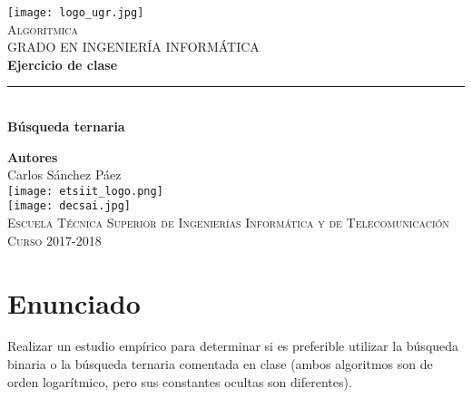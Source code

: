 \documentclass[12pt,spanish]{article}
\begin{document}
\begin{titlepage}

\newlength{\centeroffset}
\setlength{\centeroffset}{-0.5\oddsidemargin}
\addtolength{\centeroffset}{0.5\evensidemargin}
\thispagestyle{empty}

\noindent\hspace*{\centeroffset}
\begin{minipage}{\textwidth}

\centering
\texttt{[image: logo\_ugr.jpg]}\\[1.4cm]

\textsc{ \Large Algorítmica\\[0.2cm]}
\textsc{GRADO EN INGENIERÍA INFORMÁTICA}\\[1cm]

{\Huge\bfseries Ejercicio de clase\\}
\noindent\rule[-1ex]{\textwidth}{3pt}\\[3.5ex]
{\large\bfseries Búsqueda ternaria}
\end{minipage}

\vspace{1.5cm}
\noindent\hspace*{\centeroffset}
\begin{minipage}{\textwidth}
\centering

\textbf{Autores}\\ {Carlos Sánchez Páez}\\[2.5ex]
\texttt{[image: etsiit\_logo.png]}\\[0.1cm]
\vspace{1.5cm}
\texttt{[image: decsai.jpg]}\\[0.1cm]
\vspace{1cm}
\textsc{Escuela Técnica Superior de Ingenierías Informática y de Telecomunicación}\\
\vspace{1cm}
\textsc{Curso 2017-2018}
\end{minipage}
\end{titlepage}
\tableofcontents
\thispagestyle{empty}
\listoftables
\newpage
\setcounter{page}{1}

\section{Enunciado}
\large{Realizar un estudio empírico para determinar si es preferible utilizar la búsqueda binaria o la búsqueda ternaria comentada en clase (ambos algoritmos son de orden logarítmico, pero sus constantes ocultas son diferentes).}
\end{document}
